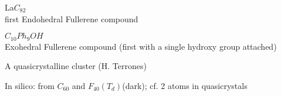 \documentclass[%
pdf,
colorBG,
slideColor,
]{prosper}
\begin{document}
\begin{slide}{}

\begin{center}
\begin{minipage}[b]{5.5cm}
\centering
{}\par
La\@$C_{82}$\\
first Endohedral Fullerene compound
\end{minipage}
\begin{minipage}[b]{5.5cm}
\centering
{}\par
$C_{10}Ph_{9}OH$\\
Exohedral Fullerene compound
(first with a single hydroxy group attached)
\end{minipage}
\end{center}

\end{slide}


\begin{slide}{A quasicrystalline cluster (H. Terrones)}
\vspace{-4mm}
\begin{center}
\begin{minipage}{8.5cm}
\centering
{}\par
\end{minipage}
\end{center}

\begin{center}
In silico: from $C_{60}$ and $F_{40}(T_d)$(dark); cf. 2 atoms in quasicrystals
\end{center}

\end{slide}
\end{document}
